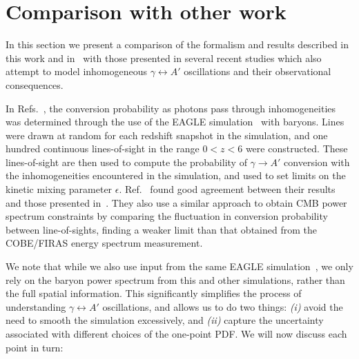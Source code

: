 \documentclass[prd,aps,10pt,nofootinbib,twocolumn,superscriptaddress,preprintnumbers,balancelastpage,longbibliography]{revtex4-1}
\begin{document}
\appendix

\section{Comparison with other work}
\label{app:comparison_with_previous_work}

In this section we present a comparison of the formalism and results described in this work and in~ with those presented in several recent studies which also attempt to model inhomogeneous $\gamma \leftrightarrow A'$ oscillations and their observational consequences.

In Refs.~\cite{Bondarenko:2020moh,Garcia:2020qrp}, the conversion probability as photons pass through inhomogeneities was determined through the use of the EAGLE simulation~\cite{McAlpine:2015tma} with baryons.
Lines were drawn at random for each redshift snapshot in the simulation, and one hundred continuous lines-of-sight in the range $0 < z < 6$ were constructed. 
These lines-of-sight are then used to compute the probability of $\gamma \to A'$ conversion with the inhomogeneities encountered in the simulation, and used to set limits on the kinetic mixing parameter $\epsilon$. 
Ref.~\cite{Garcia:2020qrp} found good agreement between their results and those presented in~. 
They also use a similar approach to obtain CMB power spectrum constraints by comparing the fluctuation in conversion probability between line-of-sights, finding a weaker limit than that obtained from the COBE/FIRAS energy spectrum measurement. 

We note that while we also use input from the same EAGLE simulation~\cite{McAlpine:2015tma}, we only rely on the baryon power spectrum from this and other simulations, rather than the full spatial information. This significantly simplifies the process of understanding $\gamma \leftrightarrow A'$ oscillations, and allows us to do two things: \emph{(i)} avoid the need to smooth the simulation excessively, and \emph{(ii)} capture the uncertainty associated with different choices of the one-point PDF. We will now discuss each point in turn:
\end{document}

